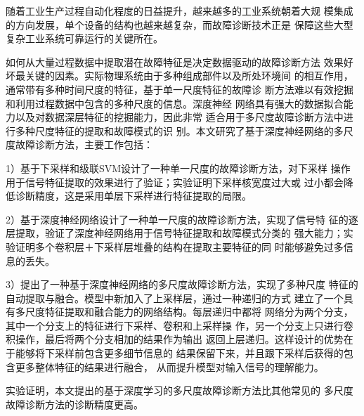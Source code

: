 \begin{cabstract}
  随着工业生产过程自动化程度的日益提升，越来越多的工业系统朝着大规
  模集成的方向发展，单个设备的结构也越来越复杂，而故障诊断技术正是
  保障这些大型复杂工业系统可靠运行的关键所在。
  
  如何从大量过程数据中提取潜在故障特征是决定数据驱动的故障诊断方法
  效果好坏最关键的因素。实际物理系统由于多种组成部件以及所处环境间
  的相互作用，通常带有多种时间尺度的特征，基于单一尺度特征的故障诊
  断方法难以有效挖掘和利用过程数据中包含的多种尺度的信息。深度神经
  网络具有强大的数据拟合能力以及对数据深层特征的挖掘能力，因此非常
  适合用于多尺度故障诊断方法中进行多种尺度特征的提取和故障模式的识
  别。本文研究了基于深度神经网络的多尺度故障诊断方法，主要工作包括：
  
  1）基于下采样和级联SVM设计了一种单一尺度的故障诊断方法，对下采样
  操作用于信号特征提取的效果进行了验证；实验证明下采样核宽度过大或
  过小都会降低诊断精度，这是采用单层下采样进行特征提取的局限。
  
  2）基于深度神经网络设计了一种单一尺度的故障诊断方法，实现了信号特
  征的逐层提取，验证了深度神经网络用于信号特征提取和故障模式分类的
  强大能力；实验证明多个卷积层＋下采样层堆叠的结构在提取主要特征的同
  时能够避免过多信息的丢失。
  
  3）提出了一种基于深度神经网络的多尺度故障诊断方法，实现了多种尺度
  特征的自动提取与融合。模型中新加入了上采样层，通过一种递归的方式
  建立了一个具有多尺度特征提取和融合能力的网络结构。每层递归中都将
  网络分为两个分支，其中一个分支上的特征进行下采样、卷积和上采样操
  作，另一个分支上只进行卷积操作，最后将两个分支相加的结果作为输出
  返回上层递归。这样设计的优势在于能够将下采样前包含更多细节信息的
  结果保留下来，并且跟下采样后获得的包含更多整体特征的结果进行融合，
  从而提升模型对输入信号的理解能力。

  实验证明，本文提出的基于深度学习的多尺度故障诊断方法比其他常见的
  多尺度故障诊断方法的诊断精度更高。

\end{cabstract}


